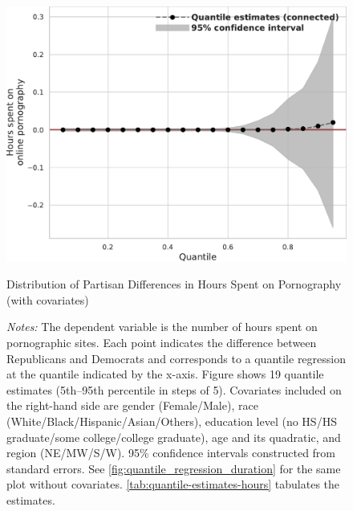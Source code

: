 \documentclass[12pt,twoside]{article}
\begin{document}
\begin{figure}[!ht]
	\centering
	\includegraphics[width=.7\linewidth]{figs/quantile_reg_covariates_duration_adult.pdf}
	\caption{Distribution of Partisan Differences in Hours Spent on Pornography (with covariates)}
	\caption*{\footnotesize \emph{Notes:} 
		The dependent variable is the number of hours spent on pornographic sites.
		Each point indicates the difference between Republicans and Democrats and corresponds to a quantile regression at the quantile indicated by the x-axis.
  Figure shows 19 quantile estimates (5th--95th percentile in steps of 5).
		Covariates included on the right-hand side are gender (Female/Male), race (White/Black/Hispanic/Asian/Others), education level (no HS/HS graduate/some college/college graduate), age and its quadratic, and region (NE/MW/S/W).
		95\% confidence intervals constructed from standard errors.
		See \cref{fig:quantile_regression_duration} for the same plot without covariates. \cref{tab:quantile-estimates-hours} tabulates the estimates.
	}
	\label{fig:quantile_regression_duration_covariates}
\end{figure}
\end{document}
